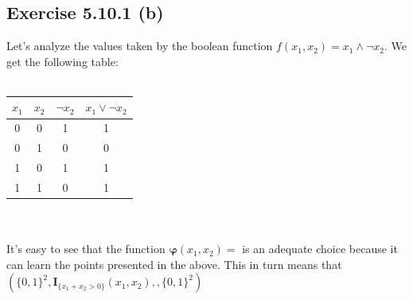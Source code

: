 \documentclass{exam}
\begin{document}
\subsection*{Exercise 5.10.1 (b)}                                                                                                  
Let's analyze the values taken by the boolean function $f(x_1, x_2) = x_{1}\land \neg x_{2}$. We get the following table:\\        
\\                                                                                                                                 
\begin{tabular}{|c c c c|}                                                                                                         
    \hline                                                                                                                         
    $x_1$ & $x_2$ & $\neg x_2$ & $x_{1}\lor \neg x_{2}$ \\ [0.5ex]                                                                
    \hline                                                                                                                         
    0     & 0     & 1      & 1 \\                                                                                                  
    \hline                                                                                                                         
    0     & 1     & 0      & 0 \\                                                                                                  
    \hline                                                                                                                         
    1     & 0     & 1      & 1 \\                                                                                                  
    \hline                                                                                                                         
    1     & 1     & 0      & 1 \\                                                                                                  
    \hline                                                                                                                         
\end{tabular}\\                                                                                                                    
\\                                                                                                                                 
It's easy to see that the function $\mathbf{\varphi}(x_1, x_2) = $ is an adequate choice because it can learn the       
points presented in the above. This in turn means that $(\{0,1\}^{2},\mathbf{I}_{\{x_1 + x_2 > 0\}}(x_1, x_2), ,\{0,1\}^{2})$
\end{document}
